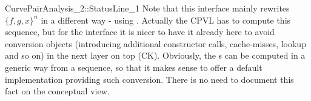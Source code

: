 \begin{ccRefConcept}{CurvePairAnalysis_2::StatusLine_1}
Note that this interface mainly rewrites $\{f,g,x\}^n$ in a different way - 
using . Actually the CPVL has to compute this sequence, but for
the interface it is nicer to have it already here to avoid conversion objects
(introducing additional constructor calls, cache-misses, lookup and so on) in
the next layer on top (CK). Obviously, the s
can be computed in a generic
way from a sequence, so that it makes sense to offer a default implementation
providing such conversion. There is no need to document this fact on the 
conceptual view.



\end{ccRefConcept}

